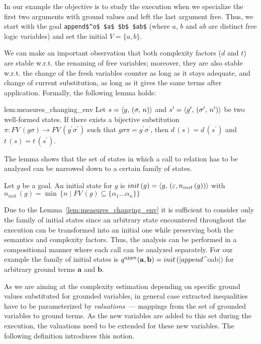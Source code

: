 In our example the objective is to study the execution when we specialize the first two arguments with
ground values and left the last argument free. Thus, we start with the goal \lstinline|append$^o$ $a$ $b$ $ab$|
(where $a$, $b$ and $ab$ are distinct free logic variables) and set the initial $V = \{ a, b \}$.

We can make an important observation that both complexity factors ($d$ and $t$) are stable w.r.t. the renaming of
free variables; moreover, they are also stable w.r.t. the change of the fresh variables counter as long as it stays
adequate, and change of current substitution, as long as it gives the same terms after application.
Formally, the following lemma holds:

\begin{replemma}{lem:measures_changing_env}
Let $s = \langle g ,\, (\sigma ,\, n) \rangle$ and $s' = \langle g^\prime ,\, (\sigma^\prime ,\, n^\prime) \rangle$ be two well-formed states.
If  there exists a bijective substitution $\pi \colon FV\,(g \sigma) \to FV\,(g^\prime \sigma^\prime)$ such that
$g \sigma \pi = g^\prime \sigma^\prime $, then $d\,(s) = d\,(s^\prime)$ and $t\,(s) = t\,(s^\prime)$.
\end{replemma}

The lemma shows that the set of states in which a call to relation has to be analyzed can
be narrowed down to a certain family of states. 

\begin{definition} Let $g$ be a goal. An initial state for $g$ is $init\,(g)=\langle g ,\, (\varepsilon, n_{init}\,(g)) \rangle $
with $ n_{init}\,(g) = \min\, \{ n \mid FV\,(g) \subseteq \{ \alpha_1\dots\alpha_n \} \} $
\end{definition}

Due to the Lemma~\ref{lem:measures_changing_env} it is sufficient to consider only the family of initial states since an arbitrary state
encountered throughout the execution can be transformed into an initial one while preserving both the semantics and
complexity factors. Thus, the analysis can be performed in a compositional manner where each call can be analyzed separately.
For our example the family of initial states is $q^{appn}(\mathbf{a}, \mathbf{b}) = init\,(\lstinline|append$^o$ $$ $$ $ab$|)$ for arbitrary ground
terms $\mathbf{a}$ and $\mathbf{b}$.

As we are aiming at the complexity estimation depending on specific ground values substituted for grounded variables, in general case extracted
inequalities have to be parameterized by \emph{valuations}~--- mappings from the set of grounded variables to ground terms. As the new variables
are added to this set during the execution, the valuations need to be extended for these new variables. The following definition introduces this notion.

